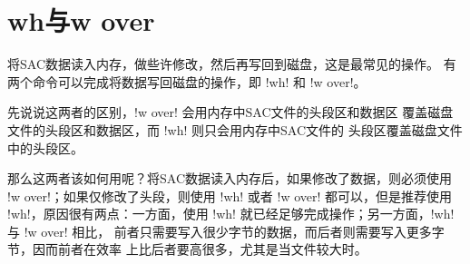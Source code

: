 \section{wh与w over}
\label{sec:wh-and-wover}
将SAC数据读入内存，做些许修改，然后再写回到磁盘，这是最常见的操作。
有两个命令可以完成将数据写回磁盘的操作，即 !wh! 和 !w over!。

先说说这两者的区别，!w over! 会用内存中SAC文件的头段区和数据区
覆盖磁盘文件的头段区和数据区，而 !wh! 则只会用内存中SAC文件的
头段区覆盖磁盘文件中的头段区。

那么这两者该如何用呢？将SAC数据读入内存后，如果修改了数据，则必须使用
!w over!；如果仅修改了头段，则使用 !wh! 或者 !w over!
都可以，但是推荐使用 !wh!，原因很有两点：一方面，使用 !wh!
就已经足够完成操作；另一方面，!wh! 与 !w over! 相比，
前者只需要写入很少字节的数据，而后者则需要写入更多字节，因而前者在效率
上比后者要高很多，尤其是当文件较大时。
